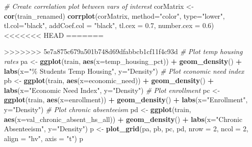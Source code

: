 \documentclass[
  man,floatsintext]{apa6}
\newenvironment{Shaded}{\begin{snugshade}}{\end{snugshade}}
\newcommand{\AttributeTok}[1]{\textcolor[rgb]{0.13,0.29,0.53}{#1}}
\newcommand{\CommentTok}[1]{\textcolor[rgb]{0.56,0.35,0.01}{\textit{#1}}}
\newcommand{\DecValTok}[1]{\textcolor[rgb]{0.00,0.00,0.81}{#1}}
\newcommand{\FloatTok}[1]{\textcolor[rgb]{0.00,0.00,0.81}{#1}}
\newcommand{\FunctionTok}[1]{\textcolor[rgb]{0.13,0.29,0.53}{\textbf{#1}}}
\newcommand{\NormalTok}[1]{#1}
\newcommand{\OtherTok}[1]{\textcolor[rgb]{0.56,0.35,0.01}{#1}}
\newcommand{\SpecialCharTok}[1]{\textcolor[rgb]{0.81,0.36,0.00}{\textbf{#1}}}
\newcommand{\StringTok}[1]{\textcolor[rgb]{0.31,0.60,0.02}{#1}}
\begin{document}
\begin{Shaded}
\begin{Highlighting}[]
\CommentTok{\# Create correlation plot between vars of interest}
\NormalTok{corMatrix }\OtherTok{\textless{}{-}} \FunctionTok{cor}\NormalTok{(train\_renamed)}
\FunctionTok{corrplot}\NormalTok{(corMatrix, }\AttributeTok{method=}\StringTok{"color"}\NormalTok{, }\AttributeTok{type=}\StringTok{"lower"}\NormalTok{, }\AttributeTok{tl.col=}\StringTok{"black"}\NormalTok{, }\AttributeTok{addCoef.col =} \StringTok{"black"}\NormalTok{, }\AttributeTok{tl.cex =} \FloatTok{0.7}\NormalTok{, }\AttributeTok{number.cex =} \FloatTok{0.6}\NormalTok{)}
<<<<<<< HEAD
=======

>>>>>>> 5e7a875c679a501b748d69dfabbcb1cf11f4c93d
\CommentTok{\# Plot temp housing rates}
\NormalTok{pa }\OtherTok{\textless{}{-}} \FunctionTok{ggplot}\NormalTok{(train, }\FunctionTok{aes}\NormalTok{(}\AttributeTok{x=}\NormalTok{temp\_housing\_pct)) }\SpecialCharTok{+}
    \FunctionTok{geom\_density}\NormalTok{() }\SpecialCharTok{+}
    \FunctionTok{labs}\NormalTok{(}\AttributeTok{x=}\StringTok{"\% Students Temp Housing"}\NormalTok{, }\AttributeTok{y=}\StringTok{"Density"}\NormalTok{)}
\CommentTok{\# Plot economic need index}
\NormalTok{pb }\OtherTok{\textless{}{-}} \FunctionTok{ggplot}\NormalTok{(train, }\FunctionTok{aes}\NormalTok{(}\AttributeTok{x=}\NormalTok{economic\_need)) }\SpecialCharTok{+}
    \FunctionTok{geom\_density}\NormalTok{() }\SpecialCharTok{+}
    \FunctionTok{labs}\NormalTok{(}\AttributeTok{x=}\StringTok{"Economic Need Index"}\NormalTok{, }\AttributeTok{y=}\StringTok{"Density"}\NormalTok{)}
\CommentTok{\# Plot enrollment}
\NormalTok{pc }\OtherTok{\textless{}{-}} \FunctionTok{ggplot}\NormalTok{(train, }\FunctionTok{aes}\NormalTok{(}\AttributeTok{x=}\NormalTok{enrollment)) }\SpecialCharTok{+}
    \FunctionTok{geom\_density}\NormalTok{() }\SpecialCharTok{+}
    \FunctionTok{labs}\NormalTok{(}\AttributeTok{x=}\StringTok{"Enrollment"}\NormalTok{, }\AttributeTok{y=}\StringTok{"Density"}\NormalTok{)}
\CommentTok{\# Plot chronic absenteeism}
\NormalTok{pd }\OtherTok{\textless{}{-}} \FunctionTok{ggplot}\NormalTok{(train, }\FunctionTok{aes}\NormalTok{(}\AttributeTok{x=}\NormalTok{val\_chronic\_absent\_hs\_all)) }\SpecialCharTok{+}
    \FunctionTok{geom\_density}\NormalTok{() }\SpecialCharTok{+}
    \FunctionTok{labs}\NormalTok{(}\AttributeTok{x=}\StringTok{"Chronic Absenteeism"}\NormalTok{, }\AttributeTok{y=}\StringTok{"Density"}\NormalTok{)}
\NormalTok{p }\OtherTok{\textless{}{-}} \FunctionTok{plot\_grid}\NormalTok{(pa, pb, pc, pd, }\AttributeTok{nrow =} \DecValTok{2}\NormalTok{, }\AttributeTok{ncol =} \DecValTok{2}\NormalTok{, }\AttributeTok{align =} \StringTok{"hv"}\NormalTok{, }\AttributeTok{axis =} \StringTok{"t"}\NormalTok{)}
\NormalTok{p}


\end{Highlighting}
\end{Shaded}
\end{document}

